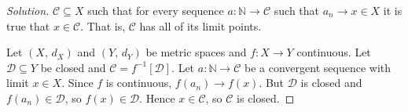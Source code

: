 \documentclass{article}
\theoremstyle{normal}
\begin{document}
\begin{proof}[Solution]
        $\mathcal{C}\subseteq{X}$ such that for every sequence
        $a:\mathbb{N}\rightarrow\mathcal{C}$ such that
        $a_{n}\rightarrow{x}\in{X}$ it is true that $x\in\mathcal{C}$. That
        is, $\mathcal{C}$ has all of its limit points.
        \par\hfill\par
        Let $(X,\,d_{X})$ and $(Y,\,d_{Y})$ be metric spaces and
        $f:X\rightarrow{Y}$ continuous. Let $\mathcal{D}\subseteq{Y}$ be closed
        and $\mathcal{C}=f^{-1}[\mathcal{D}]$. Let
        $a:\mathbb{N}\rightarrow\mathcal{C}$ be a convergent sequence with
        limit $x\in{X}$. Since $f$ is continuous, $f(a_{n})\rightarrow{f}(x)$.
        But $\mathcal{D}$ is closed and $f(a_{n})\in\mathcal{D}$, so
        $f(x)\in\mathcal{D}$. Hence $x\in\mathcal{C}$, so $\mathcal{C}$ is
        closed.
    \end{proof}
    \clearpage
    \color{blue}
\end{document}
